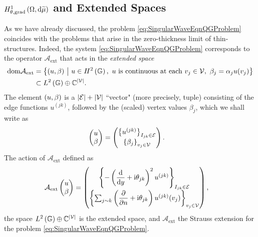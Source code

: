 \subsection{$H^1_{\theta, \mathrm{grad}}\left( \Omega, \mathrm{d}\widetilde{\mu} \right)$ and Extended Spaces} \label{ssec:ExtendedSpaces}
As we have already discussed, the problem \eqref{eq:SingularWaveEqnQGProblem} coincides with the problems that arise in the zero-thickness limit of thin-structures.
Indeed, the system \eqref{eq:SingularWaveEqnQGProblem} corresponds to the operator $\mathcal{A}_{\mathrm{ext}}$ that acts in the \emph{extended space}
\begin{align*}
	\mathrm{dom}\mathcal{A}_{\mathrm{ext}} 
	&= \left\{  (u, \beta) \ \middle\vert \  u\in H^2\left( \mathbb{G} \right), \ u \text{ is continuous at each } v_j\in\mathcal{V}, \ \beta_j=\alpha_j u(v_j)  \right\} \\
	& \subset L^2\left( \mathbb{G} \right)\oplus\mathbb{C}^{\left\lvert \mathcal{V} \right\rvert}.
\end{align*}
The element $\left( u,\beta \right)$ is a $\left\lvert \mathcal{E} \right\rvert+\left\lvert \mathcal{V} \right\rvert$ ``vector" (more precisely, tuple) consisting of the edge functions $u^{(jk)}$, followed by the (scaled) vertex values $\beta_j$, which we shall write as
\begin{align*}
	\begin{pmatrix} u \\ \beta \end{pmatrix}
	&= \begin{pmatrix} \left\{ u^{(jk)} \right\}_{I_{jk}\in\mathcal{E}} \\ \left\{ \beta_j \right\}_{v_j\in\mathcal{V}} \end{pmatrix}.
\end{align*}
The action of $\mathcal{A}_{\mathrm{ext}}$ defined as
\begin{align*}
	\mathcal{A}_{\mathrm{ext}} \begin{pmatrix} u \\ \beta \end{pmatrix}
	&= 
	\begin{pmatrix}
		\left\{ -\left( \dfrac{\mathrm{d}}{\mathrm{d}y}+\mathrm{i}\theta_{jk} \right)^2 u^{(jk)} \right\}_{I_{jk}\in\mathcal{E}} \\ 
		\left\{ \sum_{j\sim k}\left(  \dfrac{\partial }{\partial n} + \mathrm{i}\theta_{jk}  \right)u^{(jk)}(v_j) \right\}_{v_j\in\mathcal{V}}
	\end{pmatrix},
\end{align*}
the space $L^2\left( \mathbb{G} \right)\oplus\mathbb{C}^{\left\lvert \mathcal{V} \right\rvert}$ is the extended space, and $\mathcal{A}_{\mathrm{ext}}$ the Strauss extension for the problem \eqref{eq:SingularWaveEqnQGProblem}.

